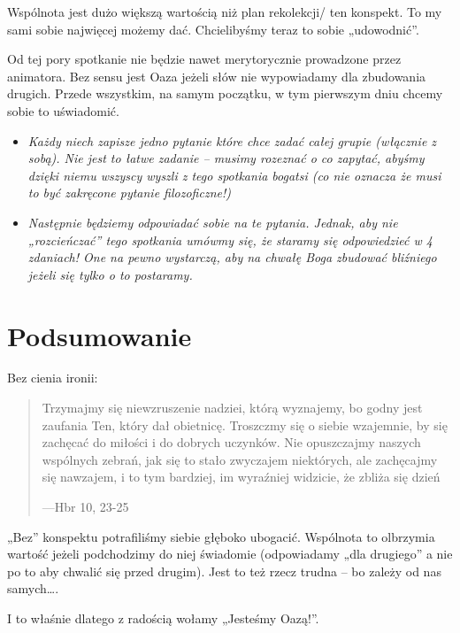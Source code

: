 \documentclass[a5paper,10pt,polish]{book}
\begin{document}
Wspólnota jest dużo większą wartością niż plan rekolekcji/ ten konspekt. To my sami sobie najwięcej możemy dać. Chcielibyśmy teraz to sobie „udowodnić”.

Od tej pory spotkanie nie będzie nawet merytorycznie prowadzone przez animatora. Bez sensu jest Oaza jeżeli słów nie wypowiadamy dla zbudowania drugich. Przede
wszystkim, na samym początku, w tym pierwszym dniu chcemy sobie to uświadomić.
\begin{itemize}
\item {} 
\emph{Każdy niech zapisze jedno pytanie które chce zadać całej grupie (włącznie z sobą). Nie jest to łatwe zadanie – musimy rozeznać o co zapytać, abyśmy dzięki niemu wszyscy wyszli z tego spotkania bogatsi (co nie oznacza że musi to być zakręcone pytanie filozoficzne!)}

\item {} 
\emph{Następnie będziemy odpowiadać sobie na te pytania. Jednak, aby nie „rozcieńczać” tego spotkania umówmy się, że staramy się odpowiedzieć w 4 zdaniach! One na pewno wystarczą, aby na chwałę Boga zbudować bliźniego jeżeli się tylko o to postaramy.}

\end{itemize}


\section{Podsumowanie}
\label{babice2006-jesien-gliwice/spotkanie1:podsumowanie}
Bez cienia ironii:
\begin{quote}

Trzymajmy się niewzruszenie nadziei, którą wyznajemy, bo godny jest zaufania Ten, który dał obietnicę. Troszczmy się o siebie wzajemnie, by się zachęcać do miłości i do dobrych uczynków. Nie opuszczajmy naszych wspólnych zebrań, jak się to stało zwyczajem niektórych, ale zachęcajmy się nawzajem, i to tym bardziej, im wyraźniej widzicie, że zbliża się dzień

\begin{flushright}
---Hbr 10, 23-25
\end{flushright}
\end{quote}

„Bez” konspektu potrafiliśmy siebie głęboko ubogacić. Wspólnota to olbrzymia wartość jeżeli podchodzimy do niej świadomie (odpowiadamy „dla drugiego” a nie po to aby chwalić się przed drugim). Jest to też rzecz trudna – bo zależy od nas samych….

I to właśnie dlatego z radością wołamy „Jesteśmy Oazą!”.
\end{document}
